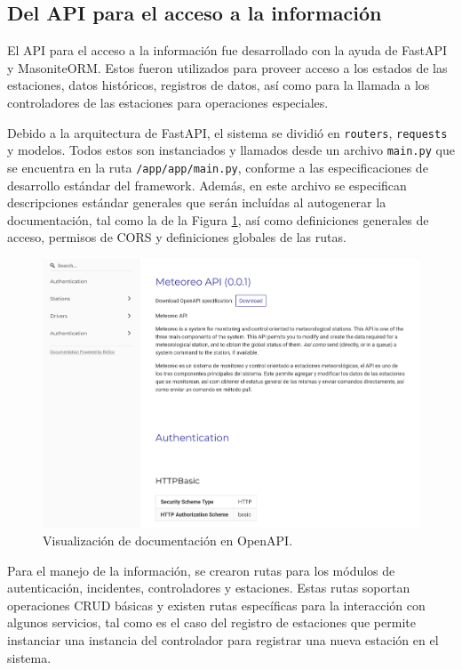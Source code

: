 \subsection{Del API para el acceso a la información}

El API para el acceso a la información fue desarrollado con la ayuda de FastAPI y MasoniteORM. Estos fueron utilizados para proveer acceso a los estados de las estaciones, datos históricos, registros de datos, así como para la llamada a los controladores de las estaciones para operaciones especiales.

Debido a la arquitectura de FastAPI, el sistema se dividió en \texttt{routers}, \texttt{requests} y modelos. Todos estos son instanciados y llamados desde un archivo \texttt{main.py} que se encuentra en la ruta \texttt{/app/app/main.py}, conforme a las especificaciones de desarrollo estándar del framework. Además, en este archivo se especifican descripciones estándar generales que serán incluídas al autogenerar la documentación, tal como la de la Figura \ref{fig:openapi_redoc}, así como definiciones generales de acceso, permisos de CORS y definiciones globales de las rutas.

\begin{figure}[!ht]
	\centering
	\includegraphics[width=1\linewidth]{images/screenshots/ReDoc_api_docs.png}
	\caption{Visualización de documentación en OpenAPI.}
	\label{fig:openapi_redoc}
\end{figure}

Para el manejo de la información, se crearon rutas para los módulos de autenticación, incidentes, controladores y estaciones. Estas rutas soportan operaciones CRUD básicas y existen rutas específicas para la interacción con algunos servicios, tal como es el caso del registro de estaciones que permite instanciar una instancia del controlador para registrar una nueva estación en el sistema.

